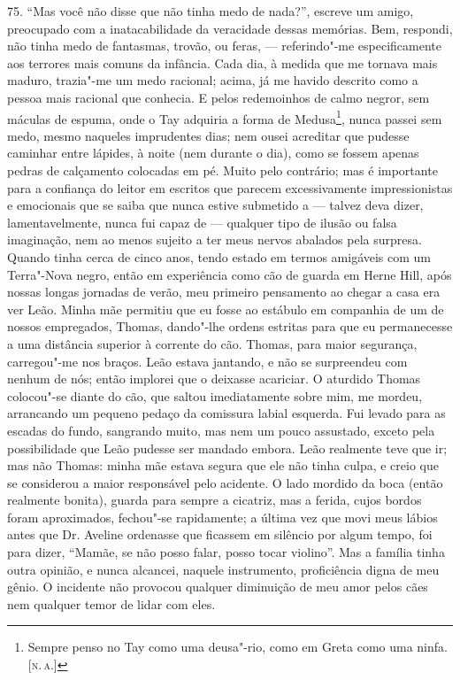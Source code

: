 75. ``Mas você não disse que não tinha medo de nada?'', escreve um
amigo, preocupado com a inatacabilidade da veracidade dessas memórias.
Bem, respondi, não tinha medo de fantasmas, trovão, ou feras, ---
referindo"-me especificamente aos terrores mais comuns da infância. Cada
dia, à medida que me tornava mais maduro, trazia"-me um medo racional;
acima, já me havido descrito como a pessoa mais racional que conhecia. E
pelos redemoinhos de calmo negror, sem máculas de espuma, onde o Tay
adquiria a forma de Medusa\footnote{Sempre penso no Tay como uma
  deusa"-rio, como em Greta como uma ninfa. {[}\textsc{n.\,a.}{]}}, nunca passei
sem medo, mesmo naqueles imprudentes dias; nem ousei acreditar que
pudesse caminhar entre lápides, à noite (nem durante o dia), como se
fossem apenas pedras de calçamento colocadas em pé. Muito pelo
contrário; mas é importante para a confiança do leitor em escritos que
parecem excessivamente impressionistas e emocionais que se saiba que
nunca estive submetido a --- talvez deva dizer, lamentavelmente, nunca
fui capaz de --- qualquer tipo de ilusão ou falsa imaginação, nem ao
menos sujeito a ter meus nervos abalados pela surpresa. Quando tinha
cerca de cinco anos, tendo estado em termos amigáveis com um Terra"-Nova
negro, então em experiência como cão de guarda em Herne Hill, após
nossas longas jornadas de verão, meu primeiro pensamento ao chegar a
casa era ver Leão. Minha mãe permitiu que eu fosse ao estábulo em
companhia de um de nossos empregados, Thomas, dando"-lhe ordens estritas
para que eu permanecesse a uma distância superior à corrente do cão.
Thomas, para maior segurança, carregou"-me nos braços. Leão estava
jantando, e não se surpreendeu com nenhum de nós; então implorei que o
deixasse acariciar. O aturdido Thomas colocou"-se diante do cão, que
saltou imediatamente sobre mim, me mordeu, arrancando um pequeno pedaço
da comissura labial esquerda. Fui levado para as escadas do fundo,
sangrando muito, mas nem um pouco assustado, exceto pela possibilidade
que Leão pudesse ser mandado embora. Leão realmente teve que ir; mas não
Thomas: minha mãe estava segura que ele não tinha culpa, e creio que se
considerou a maior responsável pelo acidente. O lado mordido da boca
(então realmente bonita), guarda para sempre a cicatriz, mas a ferida,
cujos bordos foram aproximados, fechou"-se rapidamente; a última vez que
movi meus lábios antes que Dr. Aveline ordenasse que ficassem em
silêncio por algum tempo, foi para dizer, ``Mamãe, se não posso falar,
posso tocar violino''. Mas a família tinha outra opinião, e nunca
alcancei, naquele instrumento, proficiência digna de meu gênio. O
incidente não provocou qualquer diminuição de meu amor pelos cães nem
qualquer temor de lidar com eles.

